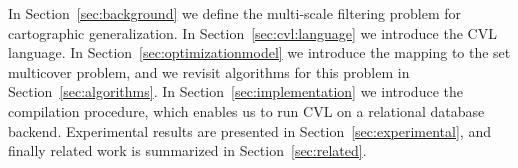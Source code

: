In Section~\ref{sec:background} we define the multi-scale filtering problem for cartographic generalization. In Section~\ref{sec:cvl:language} we introduce the CVL language. In Section~\ref{sec:optimizationmodel} we introduce the mapping to the set multicover problem, and we revisit algorithms for this problem in Section~\ref{sec:algorithms}. In Section~\ref{sec:implementation} we introduce the compilation procedure, which enables us to run CVL on a relational database backend. Experimental results are presented in Section~\ref{sec:experimental}, and finally related work is summarized in Section~\ref{sec:related}.
